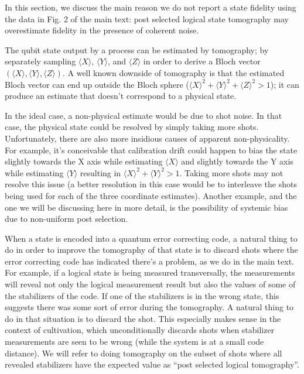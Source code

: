 In this section, we discuss the main reason we do not report a state fidelity using the data in Fig. 2 of the main text: post selected logical state tomography may overestimate fidelity in the presence of coherent noise. 

The qubit state output by a process can be estimated by tomography; by separately sampling $\langle X \rangle$, $\langle Y \rangle$, and $\langle Z \rangle$ in order to derive a Bloch vector $(\langle X \rangle, \langle Y \rangle, \langle Z \rangle)$.
A well known downside of tomography is that the estimated Bloch vector can end up outside the Bloch sphere ($\langle X \rangle^2 + \langle Y \rangle^2 + \langle Z \rangle^2 > 1$); it can produce an estimate that doesn't correspond to a physical state.

In the ideal case, a non-physical estimate would be due to shot noise.
In that case, the physical state could be resolved by simply taking more shots.
Unfortunately, there are also more insidious causes of apparent non-physicality.
For example, it's conceivable that calibration drift could happen to bias the state slightly towards the X axis while estimating $\langle X \rangle$ and slightly towards the Y axis while estimating $\langle Y \rangle$ resulting in $\langle X \rangle^2 + \langle Y \rangle^2 > 1$.
Taking more shots may not resolve this issue (a better resolution in this case would be to interleave the shots being used for each of the three coordinate estimates).
Another example, and the one we will be discussing here in more detail, is the possibility of systemic bias due to non-uniform post selection.

When a state is encoded into a quantum error correcting code, a natural thing to do in order to improve the tomography of that state is to discard shots where the error correcting code has indicated there's a problem, as we do in the main text.
For example, if a logical state is being measured transversally, the measurements will reveal not only the logical measurement result but also the values of some of the stabilizers of the code.
If one of the stabilizers is in the wrong state, this suggests there was some sort of error during the tomography.
A natural thing to do in that situation is to discard the shot.
This especially makes sense in the context of cultivation, which unconditionally discards shots when stabilizer measurements are seen to be wrong (while the system is at a small code distance).
We will refer to doing tomography on the subset of shots where all revealed stabilizers have the expected value as ``post selected logical tomography''.

